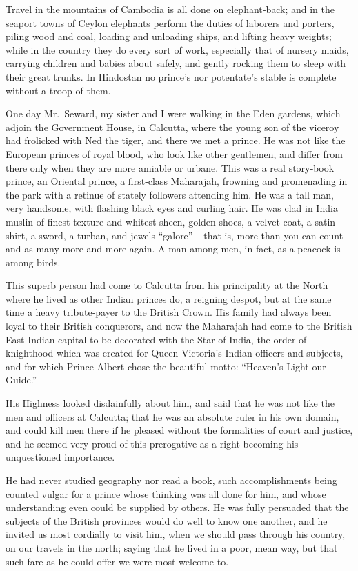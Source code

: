 \documentclass[12pt]{book}
\begin{document}
Travel in the mountains of Cambodia is all done on elephant‐back; and in the
seaport towns of Ceylon elephants perform the duties of laborers and porters,
piling wood and coal, loading and unloading ships, and lifting heavy weights;
while in the country they do every sort of work, especially that of nursery maids,
carrying children and babies about safely, and gently rocking them to sleep with
their great trunks. In Hindostan no prince’s nor potentate’s stable is complete
without a troop of them.

One day Mr.~Seward, my sister and I were walking in the Eden gardens, which
adjoin the Government House, in Calcutta, where the young son of the viceroy
had frolicked with Ned the tiger, and there we met a prince. He was not like the
European princes of royal blood, who look like other gentlemen, and differ from
there only when they are more amiable or urbane. This was a real story‐book
prince, an Oriental prince, a first‐class Maharajah, frowning and promenading
in the park with a retinue of stately followers attending him. He was a tall man,
very handsome, with flashing black eyes and curling hair. He was clad in India
muslin of finest texture and whitest sheen, golden shoes, a velvet coat, a satin
shirt, a sword, a turban, and jewels “galore” — that is, more than you can count
and as many more and more again. A man among men, in fact, as a peacock is
among birds.

This superb person had come to Calcutta from his principality at the North
where he lived as other Indian princes do, a reigning despot, but at the same time
a heavy tribute‐payer to the British Crown. His family had always been loyal to
their British conquerors, and now the Maharajah had come to the British East
Indian capital to be decorated with the Star of India, the order of knighthood
which was created for Queen Victoria’s Indian officers and subjects, and for which
Prince Albert chose the beautiful motto: “Heaven’s Light our Guide.”

His Highness looked disdainfully about him, and said that he was not like the
men and officers at Calcutta; that he was an absolute ruler in his own domain, and
could kill men there if he pleased without the formalities of court and justice, and
he seemed very proud of this prerogative as a right becoming his unquestioned
importance.

He had never studied geography nor read a book, such accomplishments being
counted vulgar for a prince whose thinking was all done for him, and whose
understanding even could be supplied by others. He was fully persuaded that
the subjects of the British provinces would do well to know one another, and he
invited us most cordially to visit him, when we should pass through his country,
on our travels in the north; saying that he lived in a poor, mean way, but that
such fare as he could offer we were most welcome to.
\end{document}
